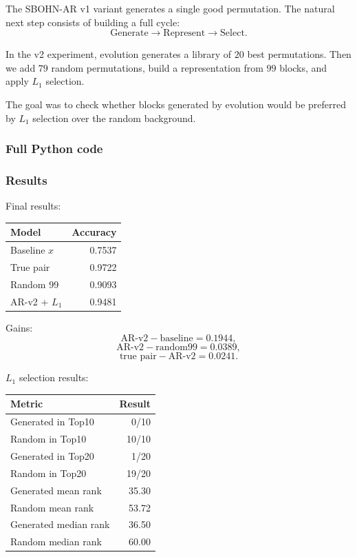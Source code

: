 \documentclass[11pt,a4paper]{report}
\begin{document}
The SBOHN-AR v1 variant generates a single good permutation. The natural next step consists of building a full cycle:
\[
\boxed{\text{Generate}\rightarrow\text{Represent}\rightarrow\text{Select}.}
\]

In the v2 experiment, evolution generates a library of $20$ best permutations. Then we add $79$ random permutations, build a representation from $99$ blocks, and apply $L_1$ selection.

The goal was to check whether blocks generated by evolution would be preferred by $L_1$ selection over the random background.

\subsubsection{Full Python code}

\noindent{}


\subsubsection{Results}

Final results:

\begin{center}
\begin{tabular}{lr}
\toprule
Model & Accuracy \\
\midrule
Baseline $x$ & 0.7537 \\
True pair & 0.9722 \\
Random 99 & 0.9093 \\
AR-v2 + $L_1$ & 0.9481 \\
\bottomrule
\end{tabular}
\end{center}

Gains:
\[
\text{AR-v2} - \text{baseline}=0.1944,
\]
\[
\text{AR-v2} - \text{random99}=0.0389,
\]
\[
\text{true pair} - \text{AR-v2}=0.0241.
\]

$L_1$ selection results:

\begin{center}
\begin{tabular}{lr}
\toprule
Metric & Result \\
\midrule
Generated in Top10 & 0/10 \\
Random in Top10 & 10/10 \\
Generated in Top20 & 1/20 \\
Random in Top20 & 19/20 \\
Generated mean rank & 35.30 \\
Random mean rank & 53.72 \\
Generated median rank & 36.50 \\
Random median rank & 60.00 \\
\bottomrule
\end{tabular}
\end{center}
\end{document}
